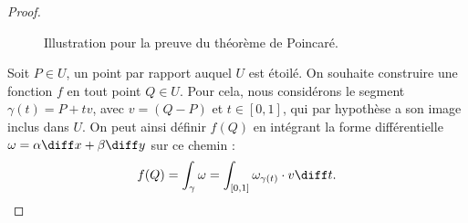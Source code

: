 \begin{proof}
\begin{figure}[ht]
\begin{center}
\caption{Illustration pour la preuve du théorème de Poincaré.}\label{fig:Poincare}
\end{center}
\end{figure}


Soit $P \in U$, un point par rapport auquel $U$ est étoilé. On souhaite construire une fonction $f$ en tout point $Q \in U$. Pour cela, nous considérons le segment $\gamma(t)=P + t v$, avec $v=(Q-P)$ et $t \in [0,1]$, qui par hypothèse a son image inclus dans $U$. On peut ainsi définir $f(Q)$ en intégrant la forme différentielle $\omega = \alpha \diff x + \beta \diff y$ sur ce chemin :
\[f(Q) = \int_\gamma \omega=\int_{[0,1]} \omega_{\gamma(t)}\cdot v \diff t.\]


\end{proof}
